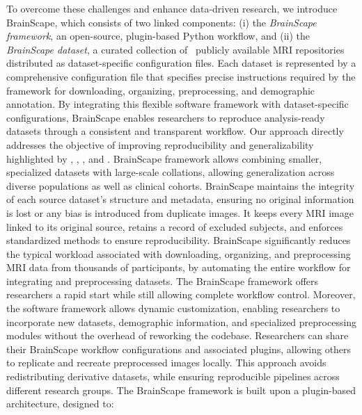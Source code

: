 To overcome these challenges and enhance data-driven research, we introduce BrainScape,
which consists of two linked components: 
(i) the \emph{BrainScape framework}, an open-source, plugin-based Python workflow, and 
(ii) the \emph{BrainScape dataset}, a curated collection of \NumDatasets\ publicly available MRI repositories distributed as dataset-specific configuration files.
Each dataset is represented by a comprehensive configuration file that specifies precise instructions 
required by the framework for downloading, organizing, preprocessing, and demographic annotation. 
By integrating this flexible software framework with dataset-specific configurations, 
BrainScape enables researchers to reproduce analysis-ready datasets through a consistent and transparent workflow.
Our approach directly addresses the objective of improving reproducibility and 
generalizability highlighted by \cite{marek2024replicability}, \cite{yang2024limits}, \cite{kiar2024experimental}, and \cite{adkinson2024brain}.
BrainScape framework allows combining smaller, specialized datasets with large-scale collations, 
allowing generalization across diverse populations as well as clinical cohorts. 
BrainScape maintains the integrity of each source dataset's structure and metadata, ensuring no original information is lost or any bias is introduced from duplicate images. 
It keeps every MRI image linked to its original source, retains a record of excluded subjects, 
and enforces standardized methods to ensure reproducibility. 
BrainScape significantly reduces the typical workload associated with downloading, 
organizing, and preprocessing MRI data from thousands of participants, 
by automating the entire workflow for integrating and preprocessing datasets. 
The BrainScape framework offers researchers a rapid start while still allowing complete workflow control.
Moreover, the software framework allows dynamic customization, enabling researchers to incorporate new datasets, demographic information, 
and specialized preprocessing modules without the overhead of reworking the codebase.
Researchers can share their BrainScape workflow configurations and associated plugins, 
allowing others to replicate and recreate preprocessed images locally. 
This approach avoids redistributing derivative datasets, 
while ensuring reproducible pipelines across different research groups. 
The BrainScape framework is built upon a plugin-based architecture, designed to:

